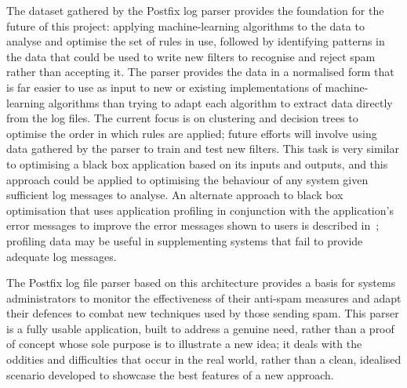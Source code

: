 \documentclass{svmult}
\begin{document}
The dataset gathered by the Postfix log parser provides the foundation for
the future of this project: applying machine-learning algorithms to the
data to analyse and optimise the set of rules in use, followed by
identifying patterns in the data that could be used to write new filters to
recognise and reject spam rather than accepting it.  The parser provides
the data in a normalised form that is far easier to use as input to new or
existing implementations of machine-learning algorithms than trying to
adapt each algorithm to extract data directly from the log files.  The
current focus is on clustering and decision trees to optimise the order in
which rules are applied; future efforts will involve using data gathered by
the parser to train and test new filters.  This task is very similar to
optimising a black box application based on its inputs and outputs, and
this approach could be applied to optimising the behaviour of any system
given sufficient log messages to analyse.  An alternate approach to black
box optimisation that uses application profiling in conjunction with the
application's error messages to improve the error messages shown to users
is described in~\cite{black-box-error-reporting}; profiling data may be
useful in supplementing systems that fail to provide adequate log messages.

The Postfix log file parser based on this architecture provides a basis for
systems administrators to monitor the effectiveness of their anti-spam
measures and adapt their defences to combat new techniques used by those
sending spam.  This parser is a fully usable application, built to address
a genuine need, rather than a proof of concept whose sole purpose is to
illustrate a new idea; it deals with the oddities and difficulties that
occur in the real world, rather than a clean, idealised scenario developed
to showcase the best features of a new approach.



\end{document}
